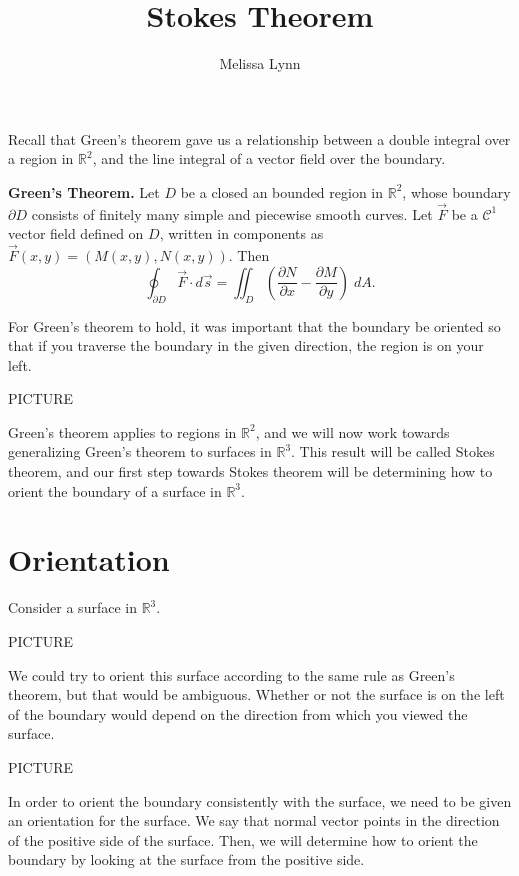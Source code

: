 \documentclass{ximera}
\title{Stokes Theorem}
\author{Melissa Lynn}
\begin{document}
  
\begin{abstract}  
\end{abstract}  
\maketitle  

Recall that Green's theorem gave us a relationship between a double integral over a region in $\mathbb{R}^2$, and the line integral of a vector field over the boundary.

\begin{theorem}
\textbf{Green's Theorem.} Let $D$ be a closed an bounded region in $\mathbb{R}^2$, whose boundary $\partial D$ consists of finitely many simple and piecewise smooth curves. Let $\vec{F}$ be a $\mathcal{C}^1$ vector field defined on $D$, written in components as $\vec{F}(x,y) = (M(x,y), N(x,y))$. Then
\[
\oint_{\partial D}\vec{F}\cdot d\vec{s} = \iint_D \left(\frac{\partial N}{\partial x} - \frac{\partial M}{\partial y}\right)\;dA.
\]
\end{theorem}

For Green's theorem to hold, it was important that the boundary be oriented so that if you traverse the boundary in the given direction, the region is on your left.

PICTURE

Green's theorem applies to regions in $\mathbb{R}^2$, and we will now work towards generalizing Green's theorem to surfaces in $\mathbb{R}^3$. This result will be called Stokes theorem, and our first step towards Stokes theorem will be determining how to  orient the boundary of a surface in $\mathbb{R}^3$.

\section*{Orientation}

Consider a surface in $\mathbb{R}^3$.

PICTURE

We could try to orient this surface according to the same rule as Green's theorem, but that would be ambiguous. Whether or not the surface is on the left of the boundary would depend on the direction from which you viewed the surface.

PICTURE

In order to orient the boundary consistently with the surface, we need to be given an orientation for the surface. We say that normal vector points in the direction of the positive side of the surface. Then, we will determine how to orient the boundary by looking at the surface from the positive side.
\end{document}
